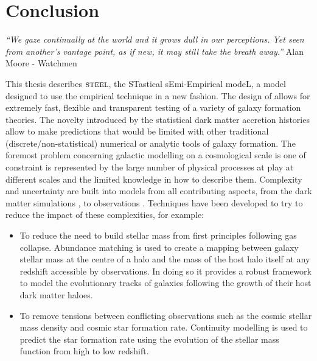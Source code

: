 
\chapter{Conclusion} %
\label{Chapter:Conclusion}
\begin{center}
    \textit{``We gaze continually at the world and it grows dull in our perceptions. Yet seen from another's vantage point, as if new, it may still take the breath away.''}
    Alan Moore - Watchmen
\end{center}


This thesis describes $\textsc{steel}$, the STastical sEmi-Empirical modeL, a model designed to use the empirical technique in a new fashion. The design of \steel allows for extremely fast, flexible and transparent testing of a variety of galaxy formation theories. The novelty introduced by the statistical dark matter accretion histories allow \steel to make predictions that would be limited with other traditional (discrete/non-statistical) numerical or analytic tools of galaxy formation. The foremost problem concerning galactic modelling on a cosmological scale is one of constraint is represented by the large number of physical processes at play at different scales and the limited knowledge in how to describe them. Complexity and uncertainty are built into models from all contributing aspects, from the dark matter simulations \cite[e.g.]{vandenBosch2018DisruptionFiction}, to observations \cite[e.g.]{Bernardi2017ComparingLight, Lapi2017StellarEquation, Leja2019AnSurvey}. Techniques have been developed to try to reduce the impact of these complexities, for example:
\begin{itemize}
    \item To reduce the need to build stellar mass from first principles following gas collapse. Abundance matching is used to create a mapping between galaxy stellar mass at the centre of a halo and the mass of the host halo itself at any redshift accessible by observations. In doing so it provides a robust framework to model the evolutionary tracks of galaxies following the growth of their host dark matter haloes.
    \item To remove tensions between conflicting observations such as the cosmic stellar mass density and cosmic star formation rate. Continuity modelling is used to predict the star formation rate using the evolution of the stellar mass function from high to low redshift. 
\end{itemize}

